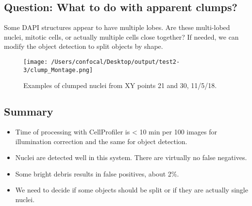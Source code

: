 \documentclass[]{article}
\providecommand{\tightlist}{%
  \setlength{\itemsep}{0pt}\setlength{\parskip}{0pt}}
\begin{document}
\subsection{Question: What to do with apparent
clumps?}\label{question-what-to-do-with-apparent-clumps}

Some DAPI structures appear to have multiple lobes. Are these
multi-lobed nuclei, mitotic cells, or actually multiple cells close
together? If needed, we can modify the object detection to split objects
by shape.

\begin{figure}
\centering
\texttt{[image: /Users/confocal/Desktop/output/test2-3/clump\_Montage.png]}
\caption{Examples of clumped nuclei from XY points 21 and 30, 11/5/18.}
\end{figure}

\subsection{Summary}\label{summary}

\begin{itemize}
\tightlist
\item
  Time of processing with CellProfiler is \textless{} 10 min per 100
  images for illumination correction and the same for object detection.
\item
  Nuclei are detected well in this system. There are virtually no false
  negatives.
\item
  Some bright debris results in false positives, about 2\%.
\item
  We need to decide if some objects should be split or if they are
  actually single nuclei.
\end{itemize}
\end{document}
